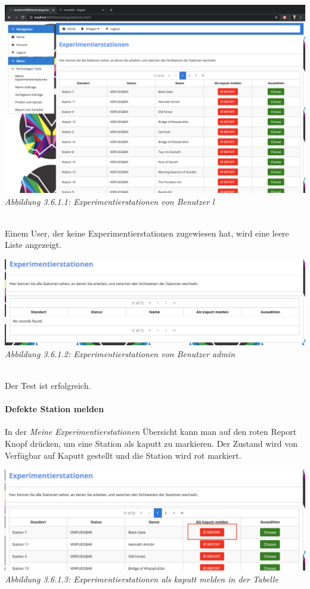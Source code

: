 \documentclass[enabledeprecatedfontcommands,fontsize=12pt,paper=a4,twoside]{scrartcl}
\begin{document}
 \hypertarget{sc3.6.1.1}{
\includegraphics[width=1\textwidth]{Screenshots/3611.png}
\textit{Abbildung 3.6.1.1: Experimentierstationen von Benutzer l}
} \\

Einem User, der keine Experimentierstationen zugewiesen hat, wird eine leere Liste angezeigt. 

 \hypertarget{sc3.6.1.2}{
\includegraphics[width=1\textwidth]{Screenshots/3612.png}
\textit{Abbildung 3.6.1.2: Experimentierstationen von Benutzer admin}
} \\

Der Test ist erfolgreich.

%
\paragraph{Defekte Station melden}

In der \textit{Meine Experimentierstationen} Übersicht kann man auf den roten Report Knopf drücken, um eine Station als kaputt zu markieren. Der Zustand wird von Verfügbar auf Kaputt gestellt und die Station wird rot markiert. 

 \hypertarget{sc3.6.1.3}{
\includegraphics[width=1\textwidth]{Screenshots/3613.png}
\textit{Abbildung 3.6.1.3: Experimentierstationen als kaputt melden in der Tabelle}
} \\
\end{document}
